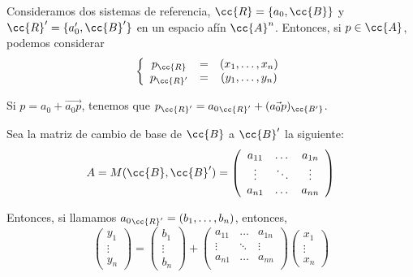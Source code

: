 Consideramos dos sistemas de referencia, $\cc{R}=\{a_0,\cc{B}\}$ y $\cc{R}'=\{a_0',\cc{B}'\}$ en un espacio afín $\cc{A}^n$. Entonces, si $p\in \cc{A}$, podemos considerar
\begin{equation*}
    \left\{\begin{array}{ccc}
        p_{\cc{R}} & = & (x_1,\dots,x_n) \\
        p_{\cc{R}'} & = & (y_1,\dots,y_n) \\
    \end{array}\right.
\end{equation*}

Si $p=a_0+\vec{a_0p}$, tenemos que $p_{\cc{R}'}={a_0}_{\cc{R}'} + (\vec{a_0p})_{\cc{B'}}$.

Sea la matriz de cambio de base de $\cc{B}$ a $\cc{B}'$ la siguiente:
\begin{equation*}
    A=M(\cc{B},\cc{B}') = \left(\begin{array}{ccc}
        a_{11} & \dots & a_{1n}\\
        \vdots & \ddots & \vdots \\
        a_{n1} & \dots & a_{nn}\\
    \end{array}\right)
\end{equation*}

Entonces, si llamamos ${a_0}_{\cc{R}'}=(b_1,\dots, b_n)$, entonces,
\begin{equation*}
    \left(\begin{array}{c}
        y_1\\ \vdots \\ y_n
    \end{array}\right)
    = 
    \left(\begin{array}{c}
        b_1\\ \vdots \\ b_n
    \end{array}\right)
    +
    \left(\begin{array}{ccc}
        a_{11} & \dots & a_{1n}\\
        \vdots & \ddots & \vdots \\
        a_{n1} & \dots & a_{nn}\\
    \end{array}\right)
    \left(\begin{array}{c}
        x_1\\ \vdots \\ x_n
    \end{array}\right)
\end{equation*}

